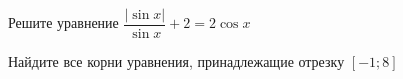 \begin{ex}
	\begin{condition}
		\begin{enumcols}[label=\asbuk*)]
			\item Решите уравнение \( \dfrac{|\sin x|}{\sin x}+ 2 =2\cos x \)
			\item Найдите все корни уравнения, принадлежащие отрезку \( \left[-1;8\right] \)
		\end{enumcols}
	\end{condition}
\end{ex}